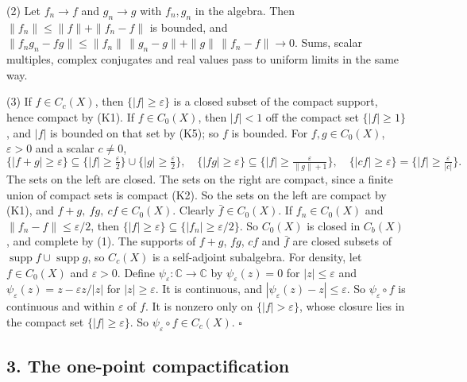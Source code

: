 \documentclass[
  english,
  11pt,
  a4paper,
]{article}
\begin{document}
(2) Let \(f_n\to f\) and \(g_n\to g\) with \(f_n,g_n\) in the algebra.
Then \(\|f_n\|\leq\|f\|+\|f_n-f\|\) is bounded, and
\(\|f_ng_n-fg\|\leq\|f_n\|\,\|g_n-g\|+\|g\|\,\|f_n-f\|\to0\). Sums,
scalar multiples, complex conjugates and real values pass to uniform
limits in the same way.

(3) If \(f\in C_c(X)\), then \(\{|f|\geq\varepsilon\}\) is a closed
subset of the compact support, hence compact by (K1). If
\(f\in C_0(X)\), then \(|f|<1\) off the compact set \(\{|f|\geq1\}\),
and \(|f|\) is bounded on that set by (K5); so \(f\) is bounded. For
\(f,g\in C_0(X)\), \(\varepsilon>0\) and a scalar \(c\neq0\),
\[\{|f+g|\geq\varepsilon\}\subseteq\{|f|\geq\tfrac\varepsilon2\}\cup\{|g|\geq\tfrac\varepsilon2\},\quad
\{|fg|\geq\varepsilon\}\subseteq\{|f|\geq\tfrac{\varepsilon}{\|g\|+1}\},\quad
\{|cf|\geq\varepsilon\}=\{|f|\geq\tfrac{\varepsilon}{|c|}\}.\] The sets
on the left are closed. The sets on the right are compact, since a
finite union of compact sets is compact (K2). So the sets on the left
are compact by (K1), and \(f+g,\ fg,\ cf\in C_0(X)\). Clearly
\(\bar f\in C_0(X)\). If \(f_n\in C_0(X)\) and
\(\|f_n-f\|\leq\varepsilon/2\), then
\(\{|f|\geq\varepsilon\}\subseteq\{|f_n|\geq\varepsilon/2\}\). So
\(C_0(X)\) is closed in \(C_b(X)\), and complete by (1). The supports of
\(f+g\), \(fg\), \(cf\) and \(\bar f\) are closed subsets of
\(\operatorname{supp}f\cup\operatorname{supp}g\), so \(C_c(X)\) is a
self-adjoint subalgebra. For density, let \(f\in C_0(X)\) and
\(\varepsilon>0\). Define \(\psi_\varepsilon:\mathbb C\to\mathbb C\) by
\(\psi_\varepsilon(z)=0\) for \(|z|\leq\varepsilon\) and
\(\psi_\varepsilon(z)=z-\varepsilon z/|z|\) for \(|z|\geq\varepsilon\).
It is continuous, and \(|\psi_\varepsilon(z)-z|\leq\varepsilon\). So
\(\psi_\varepsilon\circ f\) is continuous and within \(\varepsilon\) of
\(f\). It is nonzero only on \(\{|f|>\varepsilon\}\), whose closure lies
in the compact set \(\{|f|\geq\varepsilon\}\). So
\(\psi_\varepsilon\circ f\in C_c(X)\). \(\square\)

\subsection[3. The one-point
compactification]{\texorpdfstring{\protect\hypertarget{the-stone-weierstrass-theorem-for-functions-vanishing-at-infinity--oa-fnd-sw-02}{}{}\protect\hypertarget{the-stone-weierstrass-theorem-for-functions-vanishing-at-infinity--OA-FND-SW-03}{}{}\protect\hypertarget{the-stone-weierstrass-theorem-for-functions-vanishing-at-infinity--oa-fnd-sw-03}{}{}3.
The one-point
compactification}{3. The one-point compactification}}\label{the-stone-weierstrass-theorem-for-functions-vanishing-at-infinity--OA-FND-SW-02}
\end{document}

